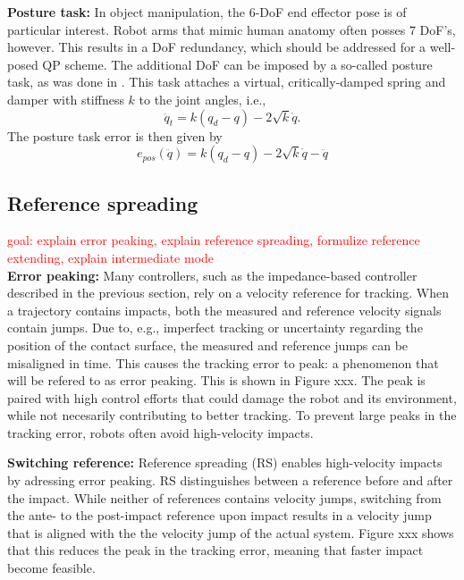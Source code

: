 \documentclass[a4paper, 10pt, conference]{ieeeconf}
\begin{document}
    \textbf{Posture task:} In object manipulation, the 6-DoF end effector pose is of particular interest. Robot arms that mimic human anatomy often posses 7 DoF's, however. This results in a DoF redundancy, which should be addressed for a well-posed QP scheme. The additional DoF can be imposed by a so-called posture task, as was done in \cite{vanoorschotDesignNumericalValidation2022}. This task attaches a virtual, critically-damped spring and damper with stiffness $k$ to the joint angles, i.e.,
    \begin{equation}
    \ddot{q}_t = k (q_d-q) - 2\sqrt{k}\dot{q}.
    \end{equation}
    The posture task error is then given by
            \begin{equation} \label{eq:e_pos} e_{pos}(\ddot{q}) = 
    k (q_d-q) - 2\sqrt{k}\dot{q} -\ddot{q}
    \end{equation}


    \subsection{Reference spreading}
     \textcolor{red}{goal: explain error peaking, explain reference spreading, formulize reference extending, explain intermediate mode }\\
    \textbf{Error peaking:} Many controllers, such as the impedance-based controller described in the previous section, rely on a velocity reference for tracking. When a trajectory contains impacts, both the measured and reference velocity signals contain jumps. Due to, e.g., imperfect tracking or uncertainty regarding the position of the contact surface, the measured and reference jumps can be misaligned in time. This causes the tracking error to peak: a phenomenon that will be refered to as error peaking. This is shown in Figure xxx. The peak is paired with high control efforts that could damage the robot and its environment, while not necesarily contributing to better tracking. To prevent large peaks in the tracking error, robots often avoid high-velocity impacts.

    \textbf{Switching reference:} Reference spreading (RS) enables high-velocity impacts by adressing error peaking. RS distinguishes between a reference before and after the impact. While neither of references contains velocity jumps, switching from the ante- to the post-impact reference upon impact results in a velocity jump that is aligned with the the velocity jump of the actual system. Figure xxx shows that this reduces the peak in the tracking error, meaning that faster impact become feasible.
\end{document}

